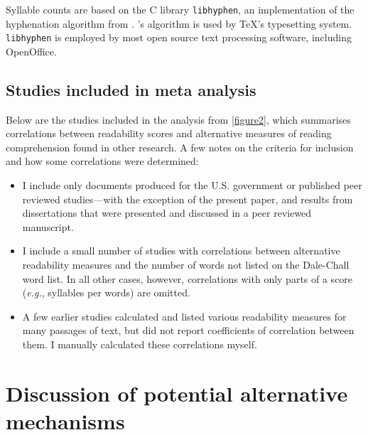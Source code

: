 \begin{appendices}
\begin{refsection}
Syllable counts are based on the C library \texttt{libhyphen}, an implementation of the hyphenation algorithm from \citet{Liang1983}.  \citet{Liang1983}'s algorithm is used by \TeX's typesetting system. \texttt{libhyphen} is employed by most open source text processing software, including OpenOffice.

\subsection{Studies included in meta analysis}
\label{appendixmetaanalysis}

Below are the studies included in the analysis from \autoref{figure2}, which summarises correlations between readability scores and alternative measures of reading comprehension found in other research. A few notes on the criteria for inclusion and how some correlations were determined:

\begin{itemize}
\item I include only documents produced for the U.S. government or published peer reviewed studies---with the exception of the present paper,  \citet{Benoit2017} and results from dissertations that were presented and discussed in a peer reviewed manuscript.

\item I include a small number of studies with correlations between alternative readability measures and the number of words not listed on the Dale-Chall word list. In all other cases, however, correlations with only parts of a score (\emph{e.g.}, syllables per words) are omitted.

\item A few earlier studies calculated and listed various readability measures for many passages of text, but did not report coefficients of correlation between them. I manually calculated these correlations myself.

\end{itemize}


\begin{refsegment}

\end{refsegment}
\printbibliography[segment=1,heading=none]
\clearpage


\section{Discussion of potential alternative mechanisms}
\label{appendixalternatives}


\end{refsection}
\end{appendices}
